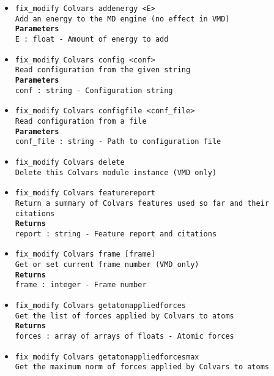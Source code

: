 \begin{itemize}
\item \texttt{fix\_modify Colvars addenergy <E>}
\\
\texttt{Add an energy to the MD engine (no effect in VMD)}
\\
\texttt{\textbf{Parameters}}
\\
\texttt{E : float - Amount of energy to add}
\item \texttt{fix\_modify Colvars config <conf>}
\\
\texttt{Read configuration from the given string}
\\
\texttt{\textbf{Parameters}}
\\
\texttt{conf : string - Configuration string}
\item \texttt{fix\_modify Colvars configfile <conf\_file>}
\\
\texttt{Read configuration from a file}
\\
\texttt{\textbf{Parameters}}
\\
\texttt{conf\_file : string - Path to configuration file}
\item \texttt{fix\_modify Colvars delete}
\\
\texttt{Delete this Colvars module instance (VMD only)}
\item \texttt{fix\_modify Colvars featurereport}
\\
\texttt{Return a summary of Colvars features used so far and their citations}
\\
\texttt{\textbf{Returns}}
\\
\texttt{report : string - Feature report and citations}
\item \texttt{fix\_modify Colvars frame [frame]}
\\
\texttt{Get or set current frame number (VMD only)}
\\
\texttt{\textbf{Returns}}
\\
\texttt{frame : integer - Frame number}
\item \texttt{fix\_modify Colvars getatomappliedforces}
\\
\texttt{Get the list of forces applied by Colvars to atoms}
\\
\texttt{\textbf{Returns}}
\\
\texttt{forces : array of arrays of floats - Atomic forces}
\item \texttt{fix\_modify Colvars getatomappliedforcesmax}
\\
\texttt{Get the maximum norm of forces applied by Colvars to atoms}

\end{itemize}
